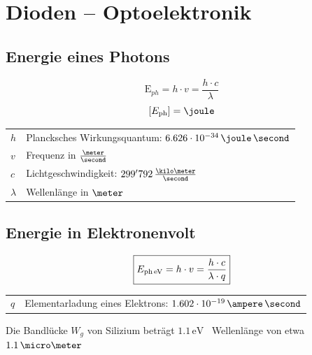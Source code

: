 \section{Dioden -- Optoelektronik}

\subsection{Energie eines Photons}

\begin{minipage}[c]{0.3\columnwidth}
	$$ \boxed{ \text{E}_{ph} = h\cdot v = \frac{h\cdot c}{\lambda} } $$
    $$ \left[ E_{\rm ph} \right] = \joule $$
\end{minipage}
\hfill
\begin{minipage}[c]{0.68\columnwidth}
    \renewcommand{\arraystretch}{1.4}
    \begin{tabular}{ll}
        $h$         & Plancksches Wirkungsquantum: $6.626 \cdot 10^{-34} \, \joule \, \second$      \\
        $v$         & Frequenz in $\frac{\meter}{\second}$                                          \\
        $c$         & Lichtgeschwindigkeit: $299'792 \, \frac{\kilo \meter}{\second}$               \\
        $\lambda$   & Wellenlänge in $\meter$
    \end{tabular}
\end{minipage}


\subsection{Energie in Elektronenvolt}

\vspace{-0.2cm}

\begin{minipage}[c]{0.3\columnwidth}
    $$ \boxed{ E_{\rm ph \, eV} = h \cdot v = \frac{h \cdot c}{\lambda \cdot q} } $$
\end{minipage}
\hfill
\begin{minipage}[c]{0.68\columnwidth}
    \begin{tabular}{ll}
       $q$  &   Elementarladung eines Elektrons: $1.602 \cdot 10^{-19} \, \ampere \, \second$
    \end{tabular}
\end{minipage}

\medskip

Die Bandlücke $W_g$ von Silizium beträgt $\bm{1.1 \, \mathrm{eV}}$ \textrightarrow\ Wellenlänge von etwa $1.1 \, \micro \meter$